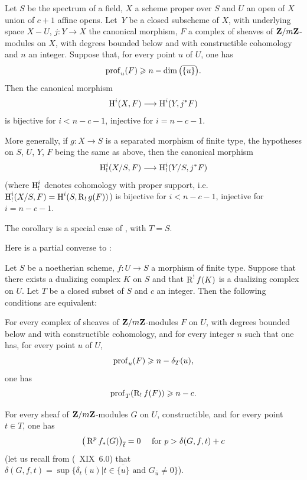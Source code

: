 \begin{corollary} \label{XIV.4.6}
Let $S$ be the spectrum of a field, $X$ a scheme proper over $S$ and $U$ an open of $X$ union of $c+1$ affine opens. Let~$Y$ be a closed subscheme of $X$, with underlying space $X-U$, $j\colon Y\to X$ the canonical morphism, $F$ a complex of sheaves of $\mathbf{Z}/m\mathbf{Z}$-modules on $X$, with degrees bounded below and with constructible cohomology and $n$ an integer. Suppose that, for every point $u$ of $U$, one has
$$
\operatorname{prof}_{u}(F)\geqslant n-\dim\big(\overline{\{ u\} }\big).
$$
Then the canonical morphism
$$
\H^{i}(X, F)\to\H^{i}(Y, j^{\ast}F)$$
is bijective for $i<n-c-1$, injective for $i=n-c-1$.

More generally, if $g\colon X\to S$ is a separated morphism of finite type, the hypotheses on $S$, $U$, $Y$, $F$ being the same as above, then the canonical morphism
$$
\H_{!}^{i}(X/S, F)\to\H_{!}^{i}(Y/S, j^{\ast}F)$$
(where $\operatorname{H}_{!}^{i}$ denotes cohomology with proper support, i.e.\ $\operatorname{H}_{!}^{i}(X/S, F)=\operatorname{H}^{i}(S, \operatorname{R}_{!}g(F))$) is bijective for $i<n-c-1$, injective for $i=n-c-1$.
\end{corollary}

The corollary is a special case of , with $T=S$.

Here is a partial converse to :

\begin{proposition} \label{XIV.4.7}
Let $S$ be a noetherian scheme, $f\colon U\to S$ a morphism of finite type. Suppose that there exists a dualizing complex $K$ on $S$ and that $\operatorname{R}^{!}f(K)$ is a dualizing complex on $U$. Let $T$ be a closed subset of $S$ and $c$ an integer. Then the following conditions are equivalent:
\begin{enumeratei}
\item
For every complex of sheaves of $\mathbf{Z}/m\mathbf{Z}$-modules $F$ on $U$, with degrees bounded below and with constructible cohomology, and for every integer $n$ such that one has, for every point $u$ of $U$,
$$
\operatorname{prof}_{u}(F)\geqslant n-\delta_{T}(u),
$$
one has
$$
\operatorname{prof}_{T}(\operatorname{R}_{!}f(F))\geqslant n-c.
$$

\item
For every sheaf of $\mathbf{Z}/m\mathbf{Z}$-modules $G$ on $U$, constructible, and for every point $t\in T$, one has
$$
\big(\operatorname{R}^{p}f_{\ast}(G)\big)_{\overline{t}}=0\quad\textrm{ for }p>\delta(G, f, t)+c$$
(let us recall from (\textup{~XIX~6.0}) that $\delta(G, f, t)=\sup\{ \delta_{t}(u)|t\in\overline{\{ u\} }\textrm{ and }G_{\overline{u}}\neq 0\}$).
\end{enumeratei}
\end{proposition}

